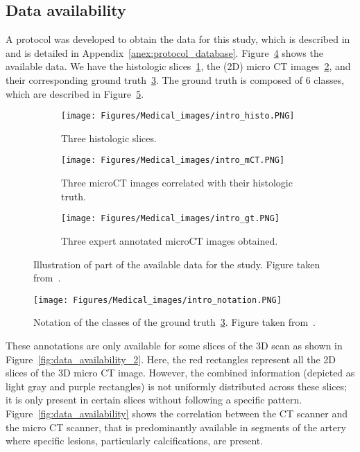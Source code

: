 \subsection{Data availability}
A protocol was developed to obtain the data for this study, which 
is described in~\citep{kuntz2021co} and is detailed in
Appendix~\ref{anex:protocol_database}.
Figure~\ref{fig:data_availability_summary} 
shows the available data.  We  have the histologic slices~\ref{fig:histo},
 the (2D) micro CT images~\ref{fig:mct_histo},
 and their corresponding ground 
truth~\ref{fig:mct_annotation}. 
The ground truth is composed of 6 classes, which are described in
Figure~\ref{fig:data_notation}.
\begin{figure}[htb!]
    \begin{subfigure}[b]{\textwidth}
            \centering
            \texttt{[image: Figures/Medical\_images/intro\_histo.PNG]}
            \caption{Three histologic slices. }
            \label{fig:histo}
    \end{subfigure}
    \begin{subfigure}[b]{\textwidth}
            \centering
            \texttt{[image: Figures/Medical\_images/intro\_mCT.PNG]}
            \caption{Three microCT images correlated with their
            histologic truth.}
            \label{fig:mct_histo}
    \end{subfigure}
    \begin{subfigure}[b]{\textwidth}
        \centering
        \texttt{[image: Figures/Medical\_images/intro\_gt.PNG]}
        \caption{Three expert annotated microCT images obtained.}
        \label{fig:mct_annotation}
    \end{subfigure}
    \caption{Illustration of part of the  available data for the study.
    Figure taken from~\citep{gangloff2020probabilistic}.}
    \label{fig:data_availability_summary}
\end{figure} 
\begin{figure}[htb!]
    \centering
    \texttt{[image: Figures/Medical\_images/intro\_notation.PNG]}
    \caption{Notation of the classes of the ground truth~\ref{fig:mct_annotation}.
    Figure taken from~\citep{gangloff2020probabilistic}.}
    \label{fig:data_notation}
\end{figure}
These annotations are only available for some slices
of the 3D scan as shown in 
Figure~\ref{fig:data_availability_2}.
Here, the red rectangles represent all the 2D slices of the 3D micro CT image.
However, the combined information (depicted as light gray and purple rectangles)
is not uniformly distributed across these slices; it is only present in certain
slices without following a specific pattern.
Figure~\ref{fig:data_availability}
shows the correlation between  the CT scanner and the micro CT scanner, 
that is predominantly available in segments of the artery
where specific lesions, particularly calcifications, are present.

